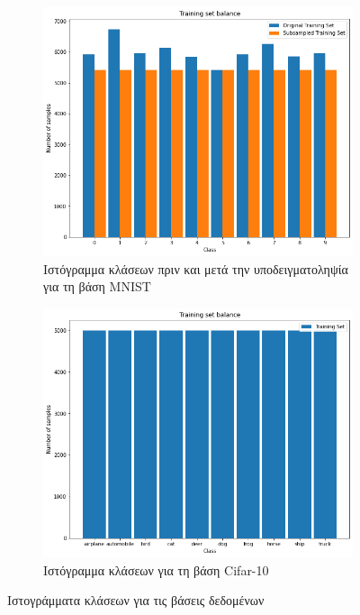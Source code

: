 \documentclass[a4paper]{article}
\begin{document}
\begin{figure}[H]
    \centering

    \begin{subfigure}[t]{0.48\linewidth}
    \includegraphics[width=\linewidth]{figures/mnist/training_freq.png}
    \caption{Ιστόγραμμα κλάσεων πριν και μετά την υποδειγματοληψία για τη βάση
    MNIST}
    \label{fig:hist1}
    \end{subfigure}
    \begin{subfigure}[t]{0.48\linewidth}
    \includegraphics[width=\linewidth]{figures/cifar/training_freq.png}
    \caption{Ιστόγραμμα κλάσεων για τη βάση Cifar-10}
    \end{subfigure}

    \caption{Ιστογράμματα κλάσεων για τις βάσεις δεδομένων}
    \label{fig:hist}
\end{figure}
\end{document}
